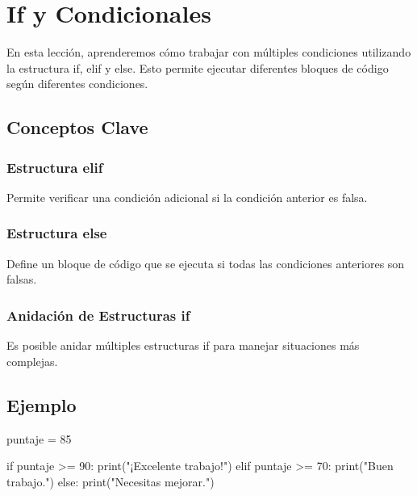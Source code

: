 \documentclass[
  a4paper,
  DIV=11,
  numbers=noendperiod,
  onepage,
  openany]{scrreprt}
\newenvironment{Shaded}{\begin{snugshade}}{\end{snugshade}}
\newcommand{\BuiltInTok}[1]{\textcolor[rgb]{0.00,0.23,0.31}{#1}}
\newcommand{\ControlFlowTok}[1]{\textcolor[rgb]{0.00,0.23,0.31}{#1}}
\newcommand{\DecValTok}[1]{\textcolor[rgb]{0.68,0.00,0.00}{#1}}
\newcommand{\NormalTok}[1]{\textcolor[rgb]{0.00,0.23,0.31}{#1}}
\newcommand{\OperatorTok}[1]{\textcolor[rgb]{0.37,0.37,0.37}{#1}}
\newcommand{\StringTok}[1]{\textcolor[rgb]{0.13,0.47,0.30}{#1}}
\begin{document}
\chapter{If y Condicionales}\label{if-y-condicionales}

En esta lección, aprenderemos cómo trabajar con múltiples condiciones
utilizando la estructura if, elif y else. Esto permite ejecutar
diferentes bloques de código según diferentes condiciones.

\section{Conceptos Clave}\label{conceptos-clave-13}

\subsection{Estructura elif}\label{estructura-elif}

Permite verificar una condición adicional si la condición anterior es
falsa.

\subsection{Estructura else}\label{estructura-else}

Define un bloque de código que se ejecuta si todas las condiciones
anteriores son falsas.

\subsection{Anidación de Estructuras
if}\label{anidaciuxf3n-de-estructuras-if}

Es posible anidar múltiples estructuras if para manejar situaciones más
complejas.

\section{Ejemplo}\label{ejemplo-8}

\begin{Shaded}
\begin{Highlighting}[]
\NormalTok{puntaje }\OperatorTok{=} \DecValTok{85}

\ControlFlowTok{if}\NormalTok{ puntaje }\OperatorTok{\textgreater{}=} \DecValTok{90}\NormalTok{:}
    \BuiltInTok{print}\NormalTok{(}\StringTok{"¡Excelente trabajo!"}\NormalTok{)}
\ControlFlowTok{elif}\NormalTok{ puntaje }\OperatorTok{\textgreater{}=} \DecValTok{70}\NormalTok{:}
    \BuiltInTok{print}\NormalTok{(}\StringTok{"Buen trabajo."}\NormalTok{)}
\ControlFlowTok{else}\NormalTok{:}
    \BuiltInTok{print}\NormalTok{(}\StringTok{"Necesitas mejorar."}\NormalTok{)}
\end{Highlighting}
\end{Shaded}
\end{document}
